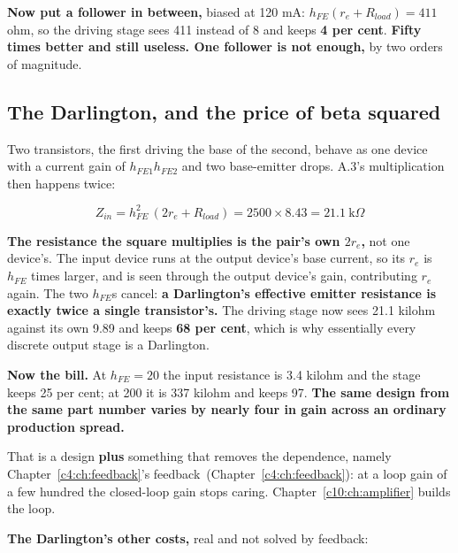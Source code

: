 
\textbf{Now put a follower in between,} biased at 120 mA: $h_{FE}(r_e + R_{load}) = 411$ ohm, so the driving stage sees 411 instead of 8 and keeps \textbf{4 per cent}. \textbf{Fifty times better and still useless. One follower is not enough,} by two orders of magnitude.

\subsection{The Darlington, and the price of beta squared}
\label{c8:sec:a5}
Two transistors, the first driving the base of the second, behave as one device with a current gain of $h_{FE1} h_{FE2}$ and two base-emitter drops. A.3's multiplication then happens twice:

\[
  Z_{in} = h_{FE}^2\,(2r_e + R_{load}) = 2500 \times 8.43 = 21.1\ \text{k}\Omega
\]

\textbf{The resistance the square multiplies is the pair's own $2r_e$,} not one device's. The input device runs at the output device's base current, so its $r_e$ is $h_{FE}$ times larger, and is seen through the output device's gain, contributing $r_e$ again. The two $h_{FE}$s cancel: \textbf{a Darlington's effective emitter resistance is exactly twice a single transistor's.} The driving stage now sees 21.1 kilohm against its own 9.89 and keeps \textbf{68 per cent}, which is why essentially every discrete output stage is a Darlington.

\textbf{Now the bill.} At $h_{FE} = 20$ the input resistance is 3.4 kilohm and the stage keeps 25 per cent; at 200 it is 337 kilohm and keeps 97. \textbf{The same design from the same part number varies by nearly four in gain across an ordinary production spread.}

That is a design \textbf{plus} something that removes the dependence, namely Chapter~\ref{c4:ch:feedback}'s feedback~(Chapter~\ref{c4:ch:feedback}): at a loop gain of a few hundred the closed-loop gain stops caring. Chapter~\ref{c10:ch:amplifier} builds the loop.

\textbf{The Darlington's other costs,} real and not solved by feedback:

